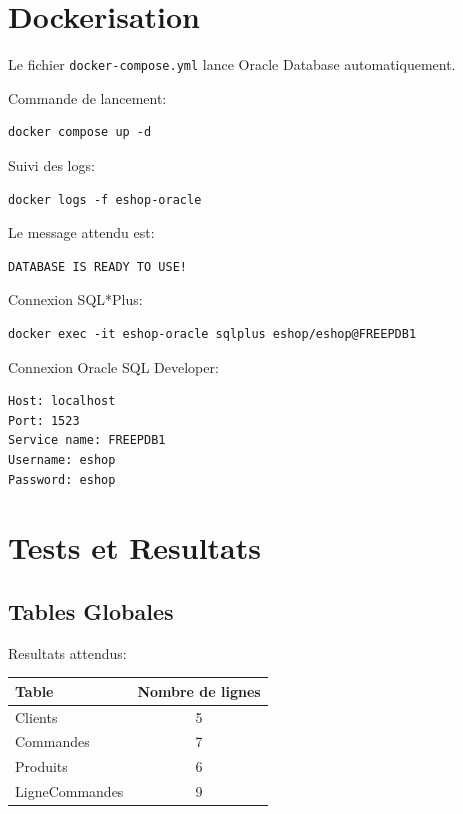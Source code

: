 \documentclass[12pt,a4paper]{report}
\begin{document}
\chapter{Dockerisation}

Le fichier \texttt{docker-compose.yml} lance Oracle Database automatiquement.

Commande de lancement:

\begin{lstlisting}[style=textstyle]
docker compose up -d
\end{lstlisting}

Suivi des logs:

\begin{lstlisting}[style=textstyle]
docker logs -f eshop-oracle
\end{lstlisting}

Le message attendu est:

\begin{lstlisting}[style=textstyle]
DATABASE IS READY TO USE!
\end{lstlisting}

Connexion SQL*Plus:

\begin{lstlisting}[style=textstyle]
docker exec -it eshop-oracle sqlplus eshop/eshop@FREEPDB1
\end{lstlisting}

Connexion Oracle SQL Developer:

\begin{lstlisting}[style=textstyle]
Host: localhost
Port: 1523
Service name: FREEPDB1
Username: eshop
Password: eshop
\end{lstlisting}

\chapter{Tests et Resultats}

\section{Tables Globales}

Resultats attendus:

\begin{center}
\begin{tabular}{|l|c|}
\hline
Table & Nombre de lignes \\
\hline
Clients & 5 \\
\hline
Commandes & 7 \\
\hline
Produits & 6 \\
\hline
LigneCommandes & 9 \\
\hline
\end{tabular}
\end{center}
\end{document}
